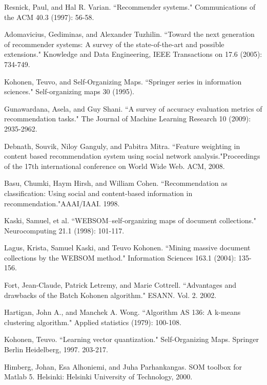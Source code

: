 \documentclass[conference]{IEEEtran}
\begin{document}
\begin{thebibliography}{1}

Resnick, Paul, and Hal R. Varian. ``Recommender systems." Communications of the ACM 40.3 (1997): 56-58.

Adomavicius, Gediminas, and Alexander Tuzhilin. ``Toward the next generation of recommender systems: A survey of the state-of-the-art and possible extensions." Knowledge and Data Engineering, IEEE Transactions on 17.6 (2005): 734-749.

Kohonen, Teuvo, and Self-Organizing Maps. ``Springer series in information sciences." Self-organizing maps 30 (1995).

Gunawardana, Asela, and Guy Shani. ``A survey of accuracy evaluation metrics of recommendation tasks." The Journal of Machine Learning Research 10 (2009): 2935-2962.

Debnath, Souvik, Niloy Ganguly, and Pabitra Mitra. ``Feature weighting in content based recommendation system using social network analysis."Proceedings of the 17th international conference on World Wide Web. ACM, 2008.

Basu, Chumki, Haym Hirsh, and William Cohen. ``Recommendation as classification: Using social and content-based information in recommendation."AAAI/IAAI. 1998.

Kaski, Samuel, et al. ``WEBSOM–self-organizing maps of document collections." Neurocomputing 21.1 (1998): 101-117.

Lagus, Krista, Samuel Kaski, and Teuvo Kohonen. ``Mining massive document collections by the WEBSOM method." Information Sciences 163.1 (2004): 135-156.

Fort, Jean-Claude, Patrick Letremy, and Marie Cottrell. ``Advantages and drawbacks of the Batch Kohonen algorithm." ESANN. Vol. 2. 2002.

Hartigan, John A., and Manchek A. Wong. ``Algorithm AS 136: A k-means clustering algorithm." Applied statistics (1979): 100-108.

Kohonen, Teuvo. ``Learning vector quantization." Self-Organizing Maps. Springer Berlin Heidelberg, 1997. 203-217.

Himberg, Johan, Esa Alhoniemi, and Juha Parhankangas. SOM toolbox for Matlab 5. Helsinki: Helsinki University of Technology, 2000.

\end{thebibliography}




\end{document}
